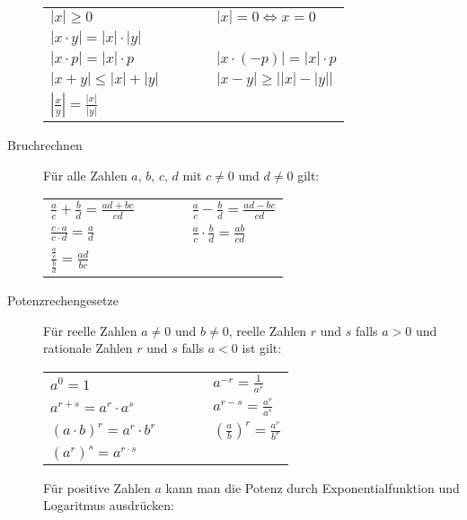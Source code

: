 \documentclass[
  ngerman,
  a4paper,
  landscape, fontsize=9pt, version=first, enabledeprecatedfontcommands,
  DIV=6]{scrartcl}
\begin{document}
\begin{multicols}{3}
\begin{description}
\begin{tabular}{ l c l }
    $|x| \geq 0$                                    & $\qquad$  &   $|x| = 0 \Longleftrightarrow x=0$ \\
    $|x \cdot y| = |x| \cdot |y|$                   &   & \\
    $|x \cdot p| = |x| \cdot p$                     & $\qquad$  &   $|x \cdot (-p)| = |x| \cdot p$ \\
    $|x+y| \leq |x| + |y|$                          & $\qquad$  &   $|x-y| \geq \left| |x| - |y| \right|$ \\
    $\left|\frac{x}{y}\right| = \frac{|x|}{|y|}$    & $\qquad$  &   \\
\end{tabular}
\item[Bruchrechnen]
Für alle Zahlen \(a\), \(b\), \(c\), \(d\) mit \(c\neq 0\) und
\(d \neq 0\) gilt:

\begin{tabular}{ l c l }
    $\displaystyle \frac{a}{c} + \frac{b}{d} = \frac{ad+bc}{cd}$    & $\qquad$  &   $\displaystyle \frac{a}{c} - \frac{b}{d} = \frac{ad-bc}{cd}$ \\
    $\displaystyle \frac{c\cdot a}{c \cdot d} = \frac{a}{d}$        & $\qquad$  &   $\displaystyle \frac{a}{c} \cdot \frac{b}{d} = \frac{ab}{cd}$ \\
    $\displaystyle \frac{\frac{a}{c}}{\frac{b}{d}} = \frac{ad}{bc}$ & & \\
\end{tabular}
\item[Potenzrechengesetze]
Für reelle Zahlen \(a\neq0\) und \(b\neq0\), reelle Zahlen \(r\) und
\(s\) falls \(a>0\) und rationale Zahlen \(r\) und \(s\) falls \(a<0\)
ist gilt:

\begin{tabular}{ l c l }
    $\displaystyle a^0 = 1$                 & $\qquad$  & $\displaystyle a^{-r} = \frac{1}{a^r}$ \\
    $\displaystyle a^{r+s} = a^r \cdot a^s$ & $\qquad$  & $\displaystyle a^{r-s} = \frac{a^r}{a^s}$ \\
    $\displaystyle (a \cdot b)^{r} = a^r \cdot b^r$ & $\qquad$  & $\displaystyle \left(\frac{a}{b}\right)^{r} = \frac{a^r}{b^r}$ \\
    $\displaystyle (a^r)^{s} = a^{r \cdot s}$ & & \\
\end{tabular}

Für positive Zahlen \(a\) kann man die Potenz durch Exponentialfunktion
und Logaritmus ausdrücken:


\end{description}
\end{multicols}
\end{document}
